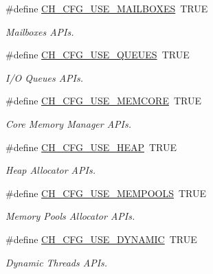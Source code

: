 \begin{DoxyCompactItemize}
\#define \hyperlink{group__config_gae7b225553e9e069eda0dc0a251e0882c}{C\+H\+\_\+\+C\+F\+G\+\_\+\+U\+S\+E\+\_\+\+M\+A\+I\+L\+B\+O\+X\+E\+S}~T\+R\+U\+E
\begin{DoxyCompactList}\small\item\em Mailboxes A\+P\+Is. \end{DoxyCompactList}\item 
\#define \hyperlink{group__config_ga9bb08f7384ee7ec4893bb28723286ee3}{C\+H\+\_\+\+C\+F\+G\+\_\+\+U\+S\+E\+\_\+\+Q\+U\+E\+U\+E\+S}~T\+R\+U\+E
\begin{DoxyCompactList}\small\item\em I/\+O Queues A\+P\+Is. \end{DoxyCompactList}\item 
\#define \hyperlink{group__config_gaad95228d05e4107b33836d30d21645a7}{C\+H\+\_\+\+C\+F\+G\+\_\+\+U\+S\+E\+\_\+\+M\+E\+M\+C\+O\+R\+E}~T\+R\+U\+E
\begin{DoxyCompactList}\small\item\em Core Memory Manager A\+P\+Is. \end{DoxyCompactList}\item 
\#define \hyperlink{group__config_ga0968280d9bbbcda48177d14d77058737}{C\+H\+\_\+\+C\+F\+G\+\_\+\+U\+S\+E\+\_\+\+H\+E\+A\+P}~T\+R\+U\+E
\begin{DoxyCompactList}\small\item\em Heap Allocator A\+P\+Is. \end{DoxyCompactList}\item 
\#define \hyperlink{group__config_ga826c1fac997fb6e976c3012d20316444}{C\+H\+\_\+\+C\+F\+G\+\_\+\+U\+S\+E\+\_\+\+M\+E\+M\+P\+O\+O\+L\+S}~T\+R\+U\+E
\begin{DoxyCompactList}\small\item\em Memory Pools Allocator A\+P\+Is. \end{DoxyCompactList}\item 
\#define \hyperlink{group__config_ga6ae82f40768d872dea807aac79e38deb}{C\+H\+\_\+\+C\+F\+G\+\_\+\+U\+S\+E\+\_\+\+D\+Y\+N\+A\+M\+I\+C}~T\+R\+U\+E
\begin{DoxyCompactList}\small\item\em Dynamic Threads A\+P\+Is. \end{DoxyCompactList}\end{DoxyCompactItemize}
